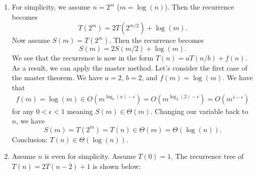 \documentclass[11pt, letterpaper, titlepage]{article}
\begin{document}
\begin{enumerate}[label=\alph*)]
    \item For simplicity, we assume $n = 2^{m}$ ($m = \log(n)$). Then the recurrence becomes 
    \begin{equation}
        T(2^{m}) = 2T(2^{m/2}) + \log(m).
    \end{equation}
    Now assume $S(m) = T(2^m)$. Then the recurrence becomes 
    \begin{equation}
        S(m) = 2S(m/2) + \log(m).
    \end{equation}
    We see that the recurrence is now in the form $T(n) = aT(n/b) + f(n)$. As a result, we can apply the master method. Let's consider the first case of the master theorem. We have $a = 2$, $b = 2$, and $f(m) = \log(m)$. We have that 
    \begin{align}
        f(m) = \log(m) \in O(m^{\log_b(a)-\epsilon}) = O(m^{\log_2(2)-\epsilon}) = O(m^{1-\epsilon})
    \end{align}
    for any $0 < \epsilon < 1$ meaning $S(m) \in \Theta(m)$. Changing our variable back to $n$, we have
    \begin{equation}
        S(m) = T(2^m) = T(n) \in \Theta(m) = \Theta(\log(n)).
    \end{equation}
    Conclusion: $T(n) \in \Theta(\log(n))$.

    \item Assume $n$ is even for simplicity. Assume $T(0) = 1$. The recurrence tree of $T(n) = 2T(n - 2) + 1$ is shown below:
    
    \begin{figure}[H]
    \centering
    \end{figure}


\end{enumerate}
\end{document}
